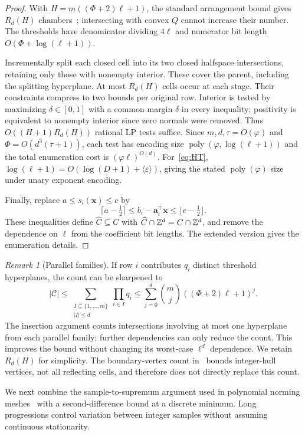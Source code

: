 \documentclass[final,5p,times,twocolumn]{elsarticle}
\theoremstyle{definition}\newtheorem{definition}{Definition}[section]
\theoremstyle{remark}\newtheorem{remark}[theorem]{Remark}
\newcommand{\eps}{\varepsilon}
\newcommand{\poly}{\operatorname{poly}}
\begin{document}
\begin{proof}
With $H=m((\Phi+2)\ell+1)$, the standard arrangement bound gives $R_d(H)$ chambers~\cite{Stanley}; intersecting with convex $Q$ cannot increase their number. The thresholds have denominator dividing $4\ell$ and numerator bit length $O(\Phi+\log(\ell+1))$.

Incrementally split each closed cell into its two closed halfspace intersections, retaining only those with nonempty interior. These cover the parent, including the splitting hyperplane. At most $R_d(H)$ cells occur at each stage. Their constraints compress to two bounds per original row. Interior is tested by maximizing $\delta\in[0,1]$ with a common margin $\delta$ in every inequality; positivity is equivalent to nonempty interior since zero normals were removed. Thus $O((H+1)R_d(H))$ rational LP tests suffice. Since $m,d,\tau=O(\varphi)$ and $\Phi=O(d^3(\tau+1))$, each test has encoding size $\poly(\varphi,\log(\ell+1))$ and the total enumeration cost is $(\varphi\ell)^{O(d)}$. For~\eqref{eq:HT}, $\log(\ell+1)=O(\log(D+1)+\langle\eps\rangle)$, giving the stated $\poly(\varphi)$ size under unary exponent encoding.

Finally, replace $a\le s_i(\mathbf{x})\le c$ by
\[
 \lceil a-\tfrac12\rceil\le b_i-\mathbf a_i^\top\mathbf{x}
 \le\lfloor c-\tfrac12\rfloor.
\]
These inequalities define $\widehat C\subseteq C$ with $\widehat C\cap\mathbb Z^d=C\cap\mathbb Z^d$, and remove the dependence on $\ell$ from the coefficient bit lengths. The extended version gives the enumeration details.
\end{proof}

\begin{remark}[Parallel families]
If row $i$ contributes $q_i$ distinct threshold hyperplanes, the count can be sharpened to
\[
 |\mathcal C|\le
 \sum_{\substack{I\subseteq\{1,\ldots,m\}\\|I|\le d}}
 \prod_{i\in I}q_i
 \le\sum_{j=0}^d\binom mj((\Phi+2)\ell+1)^j.
\]
The insertion argument counts intersections involving at most one hyperplane from each parallel family; further dependencies can only reduce the count. This improves the bound without changing its worst-case $\ell^d$ dependence. We retain $R_d(H)$ for simplicity. The boundary-vertex count in~\cite[pp.~30--31]{CHKM} bounds integer-hull vertices, not all reflecting cells, and therefore does not directly replace this count.
\end{remark}

We next combine the sample-to-supremum argument used in polynomial norming meshes~\cite[proof of Proposition~2]{PV} with a second-difference bound at a discrete minimum. Long progressions control variation between integer samples without assuming continuous stationarity.
\end{document}
